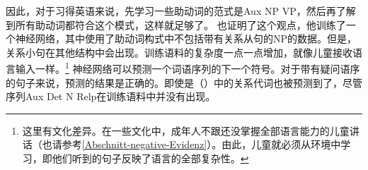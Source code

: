 因此，对于习得英语来说，先学习一些助动词的范式是Aux NP VP，然后再了解到所有助动词都符合这个模式，这样就足够了。 \citet{LE2001a}也证明了这个观点，他训练了一个神经网络，其中使用了助动词构式中不包括带有关系从句的NP的数据。但是，关系小句在其他结构中会出现。训练语料的复杂度一点一点增加，就像儿童接收语言输入一样\citep{Elman93a}。\footnote{%
  这里有文化差异。在一些文化中，成年人不跟还没掌握全部语言能力的儿童讲话\citep{Ochs82a,OS85a}（也请参考\ref{Abschnitt-negative-Evidenz}）。由此，儿童就必须从环境中学习，即他们听到的句子反映了语言的全部复杂性。
} 神经网络可以预测一个词语序列的下一个符号。对于带有疑问语序的句子来说，预测的结果是正确的。即使是（）中的关系代词也被预测到了，尽管序列Aux Det N Relp在训练语料中并没有出现。
